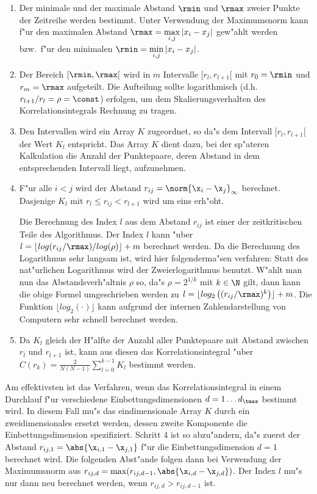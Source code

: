 \begin{enumerate}
\item Der minimale und der maximale Abstand $\rmin$ und $\rmax$ zweier Punkte der
Zeitreihe werden bestimmt. Unter Verwendung der Maximumsnorm kann f"ur den maximalen
Abstand $\rmax=\max\limits_{i,j}{\lvert x_i-x_j \rvert}$ gew"ahlt werden bzw.\  f"ur den
minimalen $\rmin=\min\limits_{i,j}{\lvert x_i-x_j \rvert}$. 
\item Der Bereich $[\rmin,\rmax[$ wird in $m$ Intervalle $[r_l,r_{l+1}[$ mit
$r_0=\rmin$ und $r_m=\rmax$ aufgeteilt. Die Aufteilung sollte logarithmisch (d.h.\
$r_{l+1}/r_l=\rho=\const$) erfolgen, um dem Skalierungsverhalten des Korrelationsintegrals
Rechnung zu tragen.
\item Den Intervallen wird ein Array $K$ zugeordnet, so da"s dem Intervall $[r_l,r_{l+1}[$
der Wert $K_l$ entspricht. Das Array $K$ dient dazu, bei der sp"ateren Kalkulation die
Anzahl der Punktepaare, deren Abstand in dem entsprechenden Intervall liegt, aufzunehmen.
\item F"ur alle $i<j$ wird der Abstand $r_{ij}=\norm{\x_i-\x_j}_\infty$
berechnet. Dasjenige $K_l$ mit $r_l\leq r_{ij}\lt r_{l+1}$ wird um eins erh"oht.

Die Berechnung des Index $l$ aus dem Abstand $r_{ij}$ ist einer der zeitkritischen Teile 
des Algorithmus. Der Index $l$ kann "uber $l=\lfloor log(r_{ij} / \rmax ) / log(\rho)
\rfloor + m$ berechnet werden. Da die Berechnung des Logarithmus sehr langsam ist, wird
hier folgenderma"sen verfahren: Statt des nat"urlichen Logarithmus wird der
Zweierlogarithmus benutzt. W"ahlt man nun das Abstandsverh"altnis $\rho$ so, da"s
$\rho=2^{1/k}$ mit $k\in\N$ gilt, dann kann die obige Formel umgeschrieben werden zu $l=\lfloor
log_2\left( (r_{ij} / \rmax )^k \right) \rfloor + m$. Die Funktion $\lfloor
log_2(\cdot) \rfloor$ kann aufgrund der internen Zahlendarstellung von Computern sehr
schnell berechnet werden.
\item Da $K_l$ gleich der H"alfte der Anzahl aller Punktepaare mit Abstand zwischen $r_l$
  und $r_{l+1}$ ist, kann aus diesen das Korrelationsintegral "uber
  $C(r_k)=\frac{2}{N(N-1)} \sum\limits_{l=0}^{k-1} K_l$ bestimmt werden.
\end{enumerate}
Am effektivsten ist das Verfahren, wenn das Korrelationsintegral in einem Durchlauf f"ur verschiedene 
Einbettungsdimensionen $d=1\dots d_\tmax$ bestimmt wird. In diesem Fall mu"s das
eindimensionale Array $K$ durch ein zweidimensionales ersetzt werden, dessen zweite
Komponente die Einbettungsdimension spezifiziert. Schritt 4 ist so
abzu"andern, da"s zuerst der Abstand $r_{ij,1}=\abs{\x_{i,1}-\x_{j,1}}$ f"ur die
Einbettungsdimension $d=1$ berechnet wird. Die folgenden Abst"ande folgen dann bei Verwendung
der Maximumsnorm aus $r_{ij,d}=\max(r_{ij,d-1},\abs{\x_{i,d}-\x_{j,d}})$. Der Index $l$
mu"s nur dann neu berechnet werden, wenn $r_{ij,d}\gt r_{ij,d-1}$ ist.

